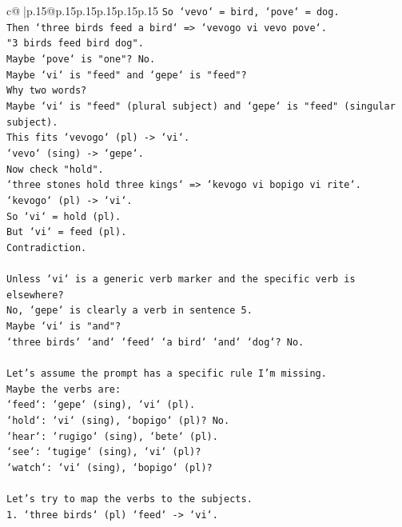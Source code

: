\documentclass{article}
\begin{document}
{\begin{supertabular}{c@{$\;$}|p{.15\linewidth}@{}p{.15\linewidth}p{.15\linewidth}p{.15\linewidth}p{.15\linewidth}p{.15\linewidth}}
{{{\texttt{So `vevo` = bird, `pove` = dog.} \\
\texttt{Then `three birds feed a bird` => `vevogo vi vevo pove`.} \\
\texttt{"3 birds feed bird dog".} \\
\texttt{Maybe `pove` is "one"? No.} \\
\texttt{Maybe `vi` is "feed" and `gepe` is "feed"?} \\
\texttt{Why two words?} \\
\texttt{Maybe `vi` is "feed" (plural subject) and `gepe` is "feed" (singular subject).} \\
\texttt{This fits `vevogo` (pl) {-}> `vi`.} \\
\texttt{`vevo` (sing) {-}> `gepe`.} \\
\texttt{Now check "hold".} \\
\texttt{`three stones hold three kings` => `kevogo vi bopigo vi rite`.} \\
\texttt{`kevogo` (pl) {-}> `vi`.} \\
\texttt{So `vi` = hold (pl).} \\
\texttt{But `vi` = feed (pl).} \\
\texttt{Contradiction.} \\
\\ 
\texttt{Unless `vi` is a generic verb marker and the specific verb is elsewhere?} \\
\texttt{No, `gepe` is clearly a verb in sentence 5.} \\
\texttt{Maybe `vi` is "and"?} \\
\texttt{`three birds` `and` `feed` `a bird` `and` `dog`? No.} \\
\\ 
\texttt{Let's assume the prompt has a specific rule I'm missing.} \\
\texttt{Maybe the verbs are:} \\
\texttt{`feed`: `gepe` (sing), `vi` (pl).} \\
\texttt{`hold`: `vi` (sing), `bopigo` (pl)? No.} \\
\texttt{`hear`: `rugigo` (sing), `bete` (pl).} \\
\texttt{`see`: `tugige` (sing), `vi` (pl)?} \\
\texttt{`watch`: `vi` (sing), `bopigo` (pl)?} \\
\\ 
\texttt{Let's try to map the verbs to the subjects.} \\
\texttt{1. `three birds` (pl) `feed` {-}> `vi`.} \\
}}}
\end{supertabular}}
\end{document}
